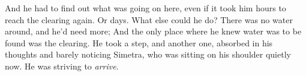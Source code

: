 And he had to find out what was going on here, even if it took him hours to reach the clearing again. Or days. 
What else could he do? There was no water around, and he'd need more; And the only place where he knew water was to be found was the clearing. 
He took a step, and another one, absorbed in his thoughts and barely noticing Simetra, who was sitting on his shoulder quietly now. 
He was striving to \emph{arrive}. 

